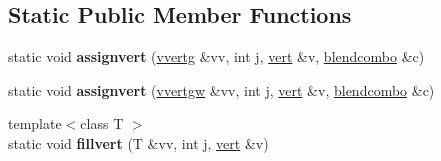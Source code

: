 \subsection*{Static Public Member Functions}
\begin{DoxyCompactItemize}
\item 
\mbox{\label{structskelmodel_1_1skelmesh_a59066fbcd87becff8e670594c8e11899}} 
static void {\bfseries assignvert} (\hyperlink{structskelmodel_1_1vvertg}{vvertg} \&vv, int j, \hyperlink{structskelmodel_1_1vert}{vert} \&v, \hyperlink{structskelmodel_1_1blendcombo}{blendcombo} \&c)
\item 
\mbox{\label{structskelmodel_1_1skelmesh_a87f384b875deef53307f36e81921c353}} 
static void {\bfseries assignvert} (\hyperlink{structskelmodel_1_1vvertgw}{vvertgw} \&vv, int j, \hyperlink{structskelmodel_1_1vert}{vert} \&v, \hyperlink{structskelmodel_1_1blendcombo}{blendcombo} \&c)
\item 
\mbox{\label{structskelmodel_1_1skelmesh_a0ccac06b33cb38da93b275598b42cc8e}} 
{\footnotesize template$<$class T $>$ }\\static void {\bfseries fillvert} (T \&vv, int j, \hyperlink{structskelmodel_1_1vert}{vert} \&v)
\end{DoxyCompactItemize}
